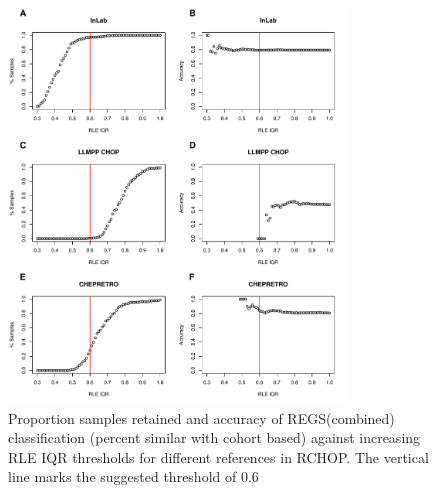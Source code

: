 \begin{figure}
	\begin{center}
		\includegraphics[width=0.8\textwidth]{figures/RCHOP_rle_classification_regs.pdf}
	\end{center}
	\caption{Proportion samples retained and accuracy of REGS(combined) classification (percent similar with cohort based) against increasing RLE IQR thresholds for different references in RCHOP. The vertical line marks the suggested threshold of 0.6}
	\label{fig:RCHOP_rle_clas_regs}
\end{figure}
